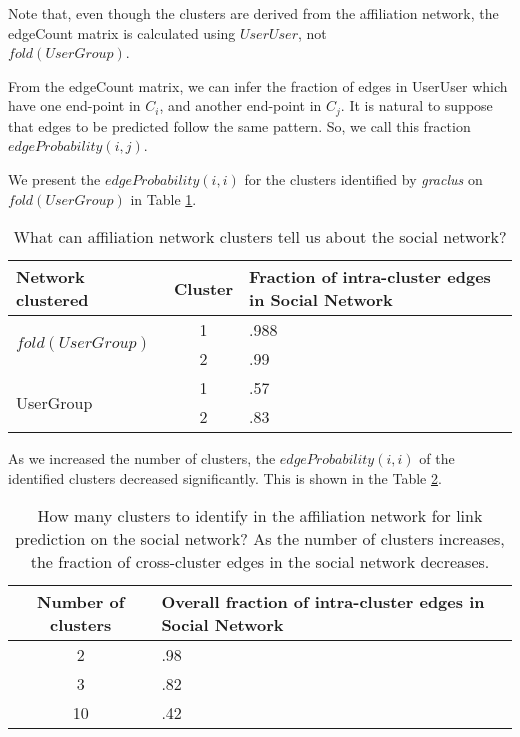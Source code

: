 \documentclass{report}
\begin{document}
Note that, even though the clusters are derived from the affiliation network, the edgeCount matrix is calculated using $UserUser$, not\\ $fold(UserGroup)$.

From the edgeCount matrix, we can infer the fraction of edges in UserUser which have one end-point in $C_i$, and another end-point in $C_j$. It is natural to suppose that edges to be predicted follow the same pattern. So, we call this fraction $edgeProbability(i, j)$.

We present the $edgeProbability(i, i)$ for the clusters identified by \textit{graclus} \cite{dhillonGraclus} on $fold(UserGroup)$ in Table \ref{tab:predictivePower}.

\begin{table}
\centering
\begin{tabular}{| l | c | p{5cm} |}
\hline
 Network clustered & Cluster & Fraction of intra-cluster edges in Social Network\\
\hline
\multirow{2}{*}{$fold(UserGroup)$} & 1 & .988\\
	& 2 & .99\\ 
\hline
\multirow{2}{*}{UserGroup} & 1 & .57\\
	& 2 & .83\\
\hline
\end{tabular}
\caption{What can affiliation network clusters tell us about the social network?}
\label{tab:predictivePower}
\end{table} 

As we increased the number of clusters, the $edgeProbability(i, i)$ of the identified clusters decreased significantly. This is shown in the Table \ref{tab:clusterNumber}.

\begin{table}
\centering
\begin{tabular}{| c | p{5cm} |}
\hline
Number of clusters & Overall fraction of intra-cluster edges in Social Network\\
\hline
2 & .98\\
3 & .82\\
10 & .42\\
\hline
\end{tabular}
\caption{How many clusters to identify in the affiliation network for link prediction on the social network? As the number of clusters increases, the fraction of cross-cluster edges in the social network decreases.}
\label{tab:clusterNumber}
\end{table}
\end{document}
